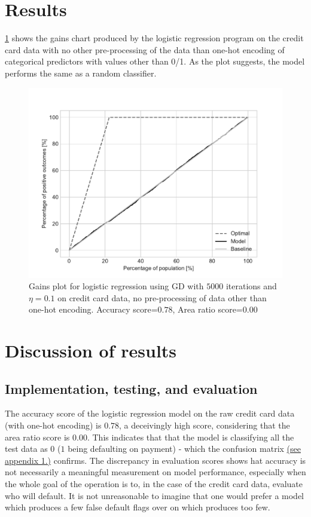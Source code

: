 \documentclass[%
oneside,                 %
final,                   %
10pt]{article}
\begin{document}
\section{Results} \label{Section_Results}
\ref{fig:logreg_no_pp} shows the gains chart produced by the logistic regression program on the credit card data with no other pre-processing of the data than one-hot encoding of categorical predictors with values other than 0/1. As the plot suggests, the model performs the same as a random classifier.  
\begin{figure}[!h]
        \centering 
         \includegraphics[scale=0.7]{../Results/CC_logreg_no_pp/gains_gd.pdf} 
        \caption{Gains plot for logistic regression using GD with $5000$ iterations and $\eta=0.1$ on credit card data, no pre-processing of data other than one-hot encoding. Accuracy score=$0.78$, Area ratio score=$0.00$}
        \label{fig:logreg_no_pp}   
\end{figure}  

\section{Discussion of results} \label{Section_Discussion_of_results}
\subsection{Implementation, testing, and evaluation}
The accuracy score of the logistic regression model on the raw credit card data (with one-hot encoding) is $0.78$, a deceivingly high score, considering that the area ratio score is $0.00$. This indicates that that the model is classifying all the test data as $0$ ($1$ being defaulting on payment) - which the confusion matrix  \hyperref[Section_M_NNclass]{(see appendix 1.)} confirms. The discrepancy  in evaluation scores shows hat accuracy is not necessarily a meaningful measurement on model performance, especially when the whole goal of the operation is to, in the case of the credit card data, evaluate who will default. It is not unreasonable to imagine that one would prefer a model which produces a few false default flags over on which produces too few.
\end{document}
